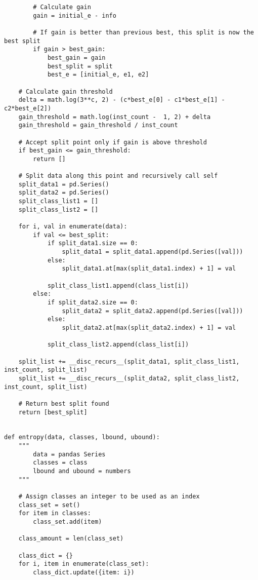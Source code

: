 \documentclass[11pt, a4paper]{article}
\begin{document}
\begin{verbatim}
        # Calculate gain
        gain = initial_e - info

        # If gain is better than previous best, this split is now the best split
        if gain > best_gain:
            best_gain = gain
            best_split = split
            best_e = [initial_e, e1, e2]

    # Calculate gain threshold
    delta = math.log(3**c, 2) - (c*best_e[0] - c1*best_e[1] - c2*best_e[2])
    gain_threshold = math.log(inst_count -  1, 2) + delta
    gain_threshold = gain_threshold / inst_count

    # Accept split point only if gain is above threshold
    if best_gain <= gain_threshold:
        return []
    
    # Split data along this point and recursively call self
    split_data1 = pd.Series()
    split_data2 = pd.Series()
    split_class_list1 = []
    split_class_list2 = []
    
    for i, val in enumerate(data):
        if val <= best_split:
            if split_data1.size == 0:
                split_data1 = split_data1.append(pd.Series([val]))
            else:
                split_data1.at[max(split_data1.index) + 1] = val
            
            split_class_list1.append(class_list[i])
        else:
            if split_data2.size == 0:
                split_data2 = split_data2.append(pd.Series([val]))
            else:
                split_data2.at[max(split_data2.index) + 1] = val

            split_class_list2.append(class_list[i])
    
    split_list += __disc_recurs__(split_data1, split_class_list1, inst_count, split_list)
    split_list += __disc_recurs__(split_data2, split_class_list2, inst_count, split_list)
    
    # Return best split found
    return [best_split]


def entropy(data, classes, lbound, ubound):
    """ 
        data = pandas Series
        classes = class
        lbound and ubound = numbers
    """
        
    # Assign classes an integer to be used as an index
    class_set = set()
    for item in classes:
        class_set.add(item)
                
    class_amount = len(class_set)
    
    class_dict = {}
    for i, item in enumerate(class_set):
        class_dict.update({item: i})
    

\end{verbatim}
\end{document}
